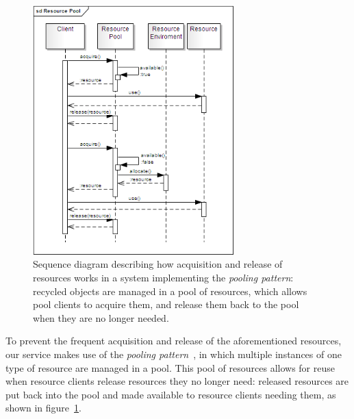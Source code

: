 \documentclass[11pt]{article}
\begin{document}




\begin{figure}[!ht]
\begin{center}
\includegraphics[width=7.75cm]{resource_pool}
\end{center}
\caption{Sequence diagram describing how acquisition and release of resources works in a 
   system implementing the \emph{pooling pattern}: recycled objects are managed in a pool 
   of resources, which allows pool clients to acquire them, and release them back to the 
   pool when they are no longer needed.}
\label{fig:rp}
\end{figure}

To prevent the frequent acquisition and release of the aforementioned resources, our service 
makes use of the \emph{pooling pattern}~\citep{kircher2001}, in which multiple instances of one 
type of resource are managed in a pool. This pool of resources allows for reuse when resource clients 
release resources they no longer need: released resources are put back into the pool and made 
available to resource clients needing them, as shown in figure~\ref{fig:rp}.
\end{document}
